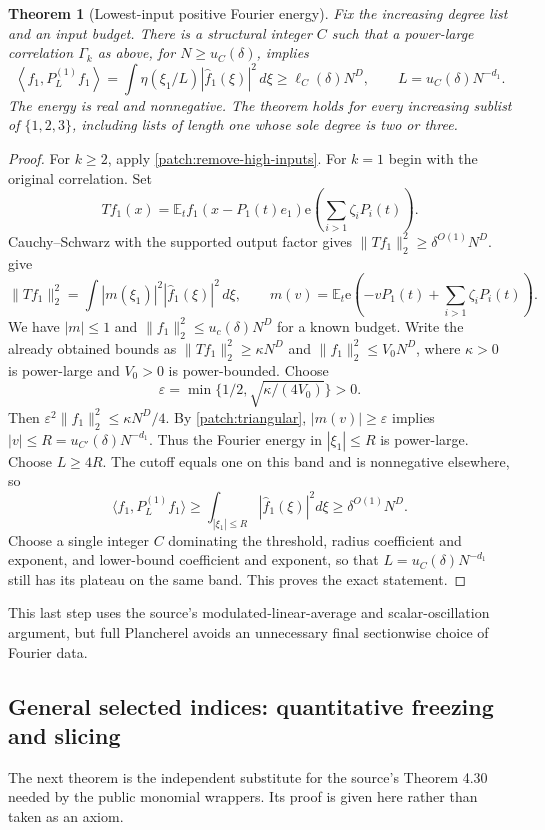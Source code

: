 \documentclass[11pt]{article}
\newtheorem{theorem}{Theorem}[section]
\theoremstyle{definition}
\newcommand{\ee}[1]{\mathrm e\!\left(#1\right)}
\begin{document}
\begin{theorem}[Lowest-input positive Fourier energy]\label{patch:lowest-energy}
Fix the increasing degree list and an input budget.  There is a structural integer $C$ such
that a power-large correlation $\Gamma_k$ as above, for $N\geq u_C(\delta)$, implies
\[
 \left\langle f_1,P_{L}^{(1)}f_1\right\rangle
       =\int\eta(\xi_1/L)|\widehat f_1(\xi)|^2\,d\xi
       \geq\ell_C(\delta)N^D,
       \qquad L=u_C(\delta)N^{-d_1}.
\]
The energy is real and nonnegative.  The theorem holds for every increasing sublist of
$\{1,2,3\}$, including lists of length one whose sole degree is two or three.
\end{theorem}
\begin{proof}
For $k\geq2$, apply \cref{patch:remove-high-inputs}.  For $k=1$ begin with the original
correlation.  Set
\[
 T f_1(x)=\mathbb E_t f_1(x-P_1(t)e_1)\ee{\sum_{i>1}\zeta_iP_i(t)}.
\]
Cauchy--Schwarz with the supported output factor gives
$\|Tf_1\|_2^2\geq\delta^{O(1)}N^D$.
 give
\[
 \|Tf_1\|_2^2=\int |m(\xi_1)|^2|\widehat f_1(\xi)|^2\,d\xi,
 \qquad m(v)=\mathbb E_t\ee{-vP_1(t)+\sum_{i>1}\zeta_iP_i(t)}.
\]
We have $|m|\leq1$ and $\|f_1\|_2^2\leq u_c(\delta)N^D$ for a known budget.
Write the already obtained bounds as $\|Tf_1\|_2^2\geq\kappa N^D$
and $\|f_1\|_2^2\leq V_0N^D$, where $\kappa>0$ is power-large and $V_0>0$ is
power-bounded. Choose
\[
 \varepsilon=\min\{1/2,\sqrt{\kappa/(4V_0)}\}>0.
\]
Then $\varepsilon^2\|f_1\|_2^2\leq\kappa N^D/4$.
By \cref{patch:triangular}, $|m(v)|\geq\varepsilon$ implies
$|v|\leq R=u_{C'}(\delta)N^{-d_1}$.
Thus the Fourier energy in $|\xi_1|\leq R$ is power-large.
Choose $L\geq4R$.  The cutoff equals one on this band and is nonnegative elsewhere, so
\[
 \langle f_1,P_L^{(1)}f_1\rangle\geq
          \int_{|\xi_1|\leq R}|\widehat f_1(\xi)|^2d\xi
                              \geq\delta^{O(1)}N^D.
\]
Choose a single integer $C$ dominating the threshold, radius coefficient and exponent,
and lower-bound coefficient and exponent, so that $L=u_C(\delta)N^{-d_1}$ still has its
plateau on the same band.  This proves the exact statement.
\end{proof}
This last step uses the source's modulated-linear-average and scalar-oscillation argument,
but full Plancherel avoids an unnecessary final sectionwise choice of Fourier data.

\subsection{General selected indices: quantitative freezing and slicing}
\label{patch:all-indices}
The next theorem is the independent substitute for the source's Theorem 4.30 needed by the
public monomial wrappers.  Its proof is given here rather than taken as an axiom.
\end{document}

